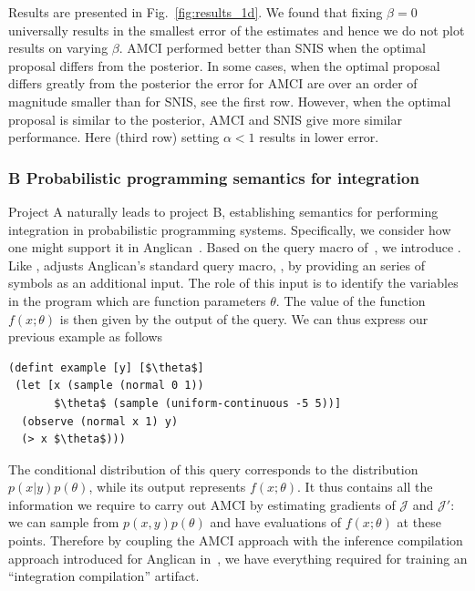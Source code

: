 \documentclass[12pt]{article}
\begin{document}
Results are presented in Fig.~\ref{fig:results_1d}. 
We found that fixing $\beta=0$ universally results in the smallest error of the estimates and hence we do not plot results on varying $\beta$.
AMCI performed better than SNIS when the optimal proposal differs from the posterior.
In some cases, when the optimal proposal differs greatly from the posterior the error for AMCI are over an order of magnitude smaller than for SNIS, see the first row.
However, when the optimal proposal is similar to the posterior, AMCI and SNIS give more similar performance.
Here (third row) setting $\alpha < 1$ results in lower error.



\subsubsection*{B \quad Probabilistic programming semantics for integration}
Project A naturally leads to project B, establishing semantics for performing integration in probabilistic programming systems.
Specifically, we consider 
how one might support it in Anglican~\citep{anglican}.
Based on the query macro  of~\citep{rainforth2016bopp}, 
we introduce .  Like ,  adjusts Anglican's
standard query macro, , by providing an series of symbols as an additional input.
The role of this input is to identify the variables in the program which
are function parameters $\theta$.  The value of the 
function $f(x;\theta)$ is then given by the output of the query.
We can thus express our previous
example as follows
\begin{lstlisting}[basicstyle=\ttfamily\small,frame=none]
(defint example [y] [$\theta$]
 (let [x (sample (normal 0 1))
       $\theta$ (sample (uniform-continuous -5 5))]
  (observe (normal x 1) y)
  (> x $\theta$)))
\end{lstlisting}
The conditional distribution of this query corresponds to the distribution
$p(x|y)p(\theta)$, while its output represents $f(x;\theta)$.  It thus
contains all the information we require to carry out AMCI by estimating
gradients of $\mathcal{J}$ and $\mathcal{J}'$:
we can sample from $p(x,y)p(\theta)$ and have evaluations of
$f(x;\theta)$ at these points.  Therefore by coupling the AMCI approach
with the inference compilation approach introduced for Anglican
in~\cite{LeEtAl2016}, we have everything required for
training an ``integration compilation'' artifact.
\end{document}
